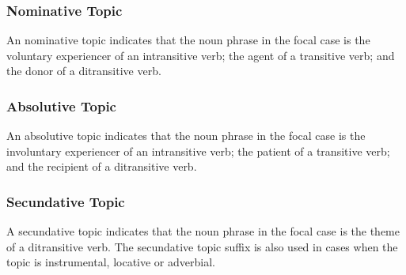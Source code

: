 \documentclass[grammar]{subfiles}
\begin{document}
  \subsubsection{Nominative Topic}
  \label{sssec:vm_nom_topic}

  An nominative topic indicates that the noun phrase in the focal case is the voluntary experiencer of an intransitive verb; the agent of a transitive verb; and the donor of a ditransitive verb.

  \subsubsection{Absolutive Topic}
  \label{sssec:vm_abs_topic}

  An absolutive topic indicates that the noun phrase in the focal case is the involuntary experiencer of an intransitive verb; the patient of a transitive verb; and the recipient of a ditransitive verb. 

  \subsubsection{Secundative Topic}
  \label{sssec:vm_sdt_topic}

  A secundative topic indicates that the noun phrase in the focal case is the theme of a ditransitive verb. The secundative topic suffix is also used in cases when the topic is instrumental, locative or adverbial.
  
%
%
%
\end{document}

